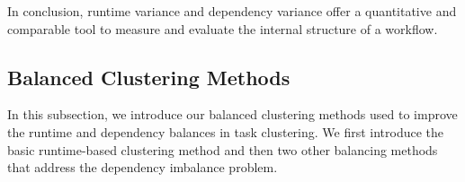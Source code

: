 In conclusion, runtime variance and dependency variance offer a quantitative and comparable tool to measure and evaluate the internal structure of a workflow. 



\subsection{Balanced Clustering Methods}
\label{sec:methods}
In this subsection, we introduce our balanced clustering methods used to improve the runtime and dependency balances in task clustering. We first introduce the basic runtime-based clustering method and then two other balancing methods that address the dependency imbalance problem. %



